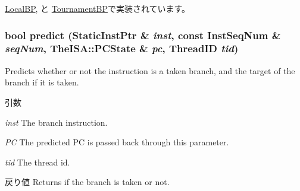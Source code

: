 \hyperlink{classLocalBP_a9c30d728e49473b5a3825835e98a10bc}{LocalBP}, と \hyperlink{classTournamentBP_a9c30d728e49473b5a3825835e98a10bc}{TournamentBP}で実装されています。\hypertarget{classBPredUnit_a9d2ad862133709eece4bf864fe378282}{
\subsubsection[{predict}]{\setlength{\rightskip}{0pt plus 5cm}bool predict ({\bf StaticInstPtr} \& {\em inst}, \/  const {\bf InstSeqNum} \& {\em seqNum}, \/  TheISA::PCState \& {\em pc}, \/  {\bf ThreadID} {\em tid})}}
\label{classBPredUnit_a9d2ad862133709eece4bf864fe378282}
Predicts whether or not the instruction is a taken branch, and the target of the branch if it is taken. 
\begin{DoxyParams}{引数}
\item[{\em inst}]The branch instruction. \item[{\em PC}]The predicted PC is passed back through this parameter. \item[{\em tid}]The thread id. \end{DoxyParams}
\begin{DoxyReturn}{戻り値}
Returns if the branch is taken or not. 
\end{DoxyReturn}



